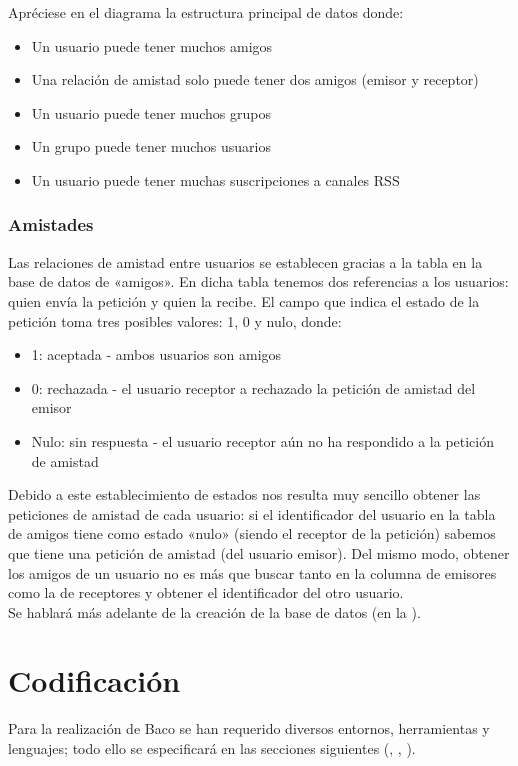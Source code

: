 \documentclass[12pt, a4paper]{book} %
\begin{document}
		Apréciese en el diagrama la estructura principal de datos donde:
		\begin{itemize}
			\item Un usuario puede tener muchos amigos
			\item Una relación de amistad solo puede tener dos amigos (emisor y receptor)
			\item Un usuario puede tener muchos grupos
			\item Un grupo puede tener muchos usuarios
			\item Un usuario puede tener muchas suscripciones a canales RSS
		\end{itemize}
			\subsection{Amistades}
			Las relaciones de amistad entre usuarios se establecen gracias a la tabla en la base de datos de «amigos». En dicha tabla tenemos dos referencias a los usuarios: quien envía la petición y quien la recibe. El campo que indica el estado de la petición toma tres posibles valores: 1, 0 y nulo, donde:
			\begin{itemize}
				\item 1: aceptada - ambos usuarios son amigos
				\item 0: rechazada - el usuario receptor a rechazado la petición de amistad del emisor
				\item Nulo: sin respuesta - el usuario receptor aún no ha respondido a la petición de amistad
			\end{itemize}
			Debido a este establecimiento de estados nos resulta muy sencillo obtener las peticiones de amistad de cada usuario: si el identificador del usuario en la tabla de amigos tiene como estado «nulo» (siendo el receptor de la petición) sabemos que tiene una petición de amistad (del usuario emisor). Del mismo modo, obtener los amigos de un usuario no es más que buscar tanto en la columna de emisores como la de receptores y obtener el identificador del otro usuario.\\
			Se hablará más adelante de la creación de la base de datos (en la ).
		
	\chapter{Codificación}
	Para la realización de Baco se han requerido diversos entornos, herramientas y lenguajes; todo ello se especificará en las secciones siguientes (, , ).
\end{document}
